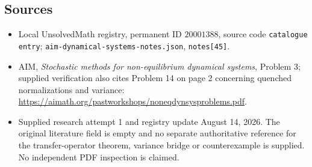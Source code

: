 \documentclass[11pt]{article}
\begin{document}
\subsection{Sources}
\begin{itemize}
\item Local UnsolvedMath registry, permanent ID \(20001388\), source code \texttt{catalogue entry}; \texttt{aim-dynamical-systems-notes.json}, \texttt{notes[45]}.
\item AIM, \emph{Stochastic methods for non-equilibrium dynamical systems}, Problem 3; supplied verification also cites Problem 14 on page 2 concerning quenched normalizations and variance: \url{https://aimath.org/pastworkshops/noneqdynsysproblems.pdf}.
\item Supplied research attempt 1 and registry update August 14, 2026. The original literature field is empty and no separate authoritative reference for the transfer-operator theorem, variance bridge or counterexample is supplied. No independent PDF inspection is claimed.
\end{itemize}
\end{document}
